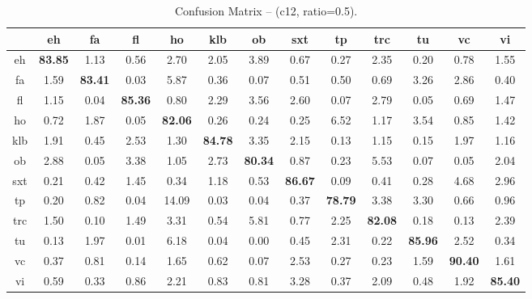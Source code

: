 \begin{table*}[h]
\begin{center}
\caption{Confusion Matrix -- (c12, ratio=0.5).}
\scriptsize
\begin{tabular}{ccccccccccccc}
\hline
  &  eh &    fa &   fl &    ho &   klb &    ob &   sxt &    tp &   trc &    tu &    vc &    vi \\
\hline
 eh & \textbf{83.85} &  1.13 &  0.56 &  2.70 &  2.05 &  3.89 &  0.67 &  0.27 &  2.35 &  0.20 &  0.78 &  1.55 \\
 fa &  1.59 & \textbf{83.41} &  0.03 &  5.87 &  0.36 &  0.07 &  0.51 &  0.50 &  0.69 &  3.26 &  2.86 &  0.40 \\
 fl & 1.15 &  0.04 & \textbf{85.36} &  0.80 &  2.29 &  3.56 &  2.60 &  0.07 &  2.79 &  0.05 &  0.69 &  1.47 \\
 ho &  0.72 &  1.87 &  0.05 & \textbf{82.06} &  0.26 &  0.24 &  0.25 &  6.52 &  1.17 &  3.54 &  0.85 &  1.42 \\
 klb &  1.91 &  0.45 &  2.53 &  1.30 & \textbf{84.78} &  3.35 &  2.15 &  0.13 &  1.15 &  0.15 &  1.97 &  1.16 \\
 ob &  2.88 &  0.05 &  3.38 &  1.05 &  2.73 & \textbf{80.34} &  0.87 &  0.23 &  5.53 &  0.07 &  0.05 &  2.04 \\
 sxt &  0.21 &  0.42 &  1.45 &  0.34 &  1.18 &  0.53 & \textbf{86.67} &  0.09 &  0.41 &  0.28 &  4.68 &  2.96 \\
 tp &  0.20 &  0.82 &  0.04 & 14.09 &  0.03 &  0.04 &  0.37 & \textbf{78.79} &  3.38 &  3.30 &  0.66 &  0.96 \\
 trc &  1.50 &  0.10 &  1.49 &  3.31 &  0.54 &  5.81 &  0.77 &  2.25 & \textbf{82.08} &  0.18 &  0.13 &  2.39 \\
 tu &  0.13 &  1.97 &  0.01 &  6.18 &  0.04 &  0.00 &  0.45 &  2.31 &  0.22 & \textbf{85.96} &  2.52 &  0.34 \\
 vc &  0.37 &  0.81 &  0.14 &  1.65 &  0.62 &  0.07 &  2.53 &  0.27 &  0.23 &  1.59 & \textbf{90.40} &  1.61 \\
 vi &  0.59 &  0.33 &  0.86 &  2.21 &  0.83 &  0.81 &  3.28 &  0.37 &  2.09 &  0.48 &  1.92 & \textbf{85.40} \\
\hline
\end{tabular}
\label{tab:things}
\end{center}
\end{table*}

